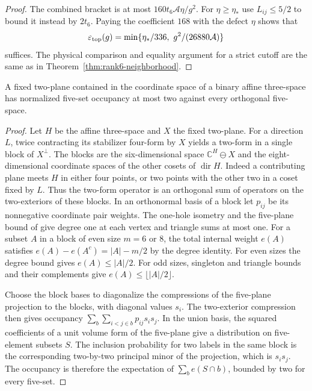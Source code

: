 \begin{proof}
The combined bracket is at most \(160t_6\mathcal A\eta/g^2\).
For \(\eta\ge\eta_*\) use \(L_{ij}\le5/2\) to bound it instead
by \(2t_6\). Paying the coefficient \(168\) with the defect
\(\eta\) shows that
\[
 \varepsilon_{\rm top}(g)=\min\{\eta_*/336,\ g^2/(26880\mathcal A)\}
\]
suffices. The physical comparison and equality argument for
a strict cutoff are the same as in Theorem~\ref{thm:rank6-neighborhood}.
\end{proof}

\begin{lemma}\label{lem:affine-eight-anchor}
A fixed two-plane contained in the coordinate space of a binary
affine three-space has normalized five-set occupancy at most two
against every orthogonal five-space.
\end{lemma}

\begin{proof}
Let \(H\) be the affine three-space and \(X\) the fixed two-plane.
For a direction \(L\), twice contracting its stabilizer four-form
by \(X\) yields a two-form in a single block of \(X^\perp\).
The blocks are the six-dimensional space \(\mathbb C^H\ominus X\)
and the eight-dimensional coordinate spaces of the other cosets
of \(\operatorname{dir}H\). Indeed a contributing plane meets
\(H\) in either four points, or two points with the other two in
a coset fixed by \(L\). Thus the two-form operator is an orthogonal
sum of operators on the two-exteriors of these blocks.
In an orthonormal basis of a block let \(p_{ij}\) be its nonnegative
coordinate pair weights. The one-hole isometry and the five-plane
bound of \cite[Theorem~17 and Corollary~4]{sierant} give degree
one at each vertex and triangle sums at most one.
For a subset \(A\) in a block of even size \(m=6\) or \(8\),
the total internal weight \(e(A)\) satisfies
\(e(A)-e(A^c)=|A|-m/2\) by the degree identity.
For even sizes the degree bound gives \(e(A)\le |A|/2\).
For odd sizes, singleton and triangle bounds and their complements
give \(e(A)\le\lfloor |A|/2\rfloor\).

Choose the block bases to diagonalize the compressions of the
five-plane projection to the blocks, with diagonal values \(s_i\).
The two-exterior compression then gives occupancy
\(\sum_b\sum_{i<j\in b}p_{ij}s_i s_j\).
In the union basis, the squared coefficients of a unit volume form
of the five-plane give a distribution on five-element subsets
\(S\). The inclusion probability for two labels in the same block
is the corresponding two-by-two principal minor of the projection,
which is \(s_i s_j\). The occupancy is therefore the expectation
of \(\sum_b e(S\cap b)\), bounded by two for every five-set.
\end{proof}

